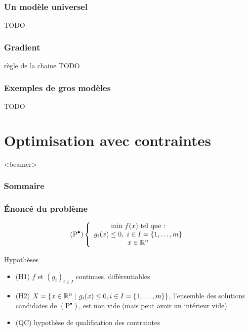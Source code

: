 \documentclass{beamer}
\newcommand{\R}{{\ensuremath\mathbb{R}}}
\begin{document}
\begin{frame}
  \frametitle{Un modèle universel}

TODO
  
\end{frame}

\begin{frame}
  \frametitle{Gradient}

  règle de la chaine
TODO
  
\end{frame}

\begin{frame}
  \frametitle{Exemples de gros modèles}

TODO
  
\end{frame}

\section{Optimisation avec contraintes}

\begin{frame}<beamer>
  \frametitle{Sommaire}
  \tableofcontents[currentsection]
\end{frame}

\begin{frame}
  \frametitle{\'Enoncé du problème}

  \[
  (\text{P}^\bullet) \left\{
  \begin{array}{c}
    \text{min} \ f(x) \ \text{tel que :} \\
    g_i(x) \leq 0, \ i \in I = \{1, \dots, m\} \\
    x \in \R^n
  \end{array}
  \right.
  \]

  \begin{block}{Hypothèses}
    \begin{itemize}
    \item (H1) $f$ et $(g_i)_{i \in I}$ continues, différentiables
    \item (H2) $X = \{ x \in \R^n \ | \ g_i(x) \leq 0, i \in I = \{1, \dots, m\} \}$,
      l'ensemble des solutions candidates de $(\text{P}^\bullet)$, est non vide
      (mais peut avoir un intérieur vide)
    \item (QC) \alert{hypothèse de qualification des contraintes}
    \end{itemize}
  \end{block}
  
\end{frame}
\end{document}
